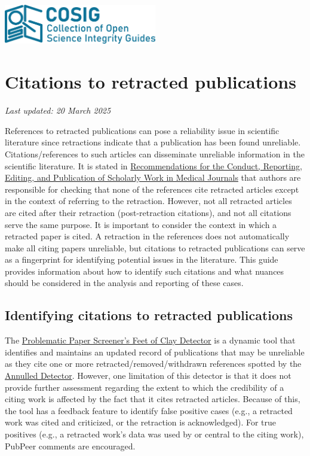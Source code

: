 \documentclass[letterpaper, 12pt]{article}
\begin{document}
\flushleft
\includegraphics[width=0.5\textwidth]{img/home/241017_final_logo_mockup.png}

\section*{Citations to retracted publications}
\textit{Last updated: 20 March 2025}

References to retracted publications can pose a reliability issue in scientific literature since retractions indicate that a publication has been found unreliable. Citations/references to such articles can disseminate unreliable information in the scientific literature. It is stated in \href{https://www.icmje.org/icmje-recommendations.pdf}{Recommendations for the Conduct, Reporting, Editing, and Publication of Scholarly Work in Medical Journals} that authors are responsible for checking that none of the references cite retracted articles except in the context of referring to the retraction. 
However, not all retracted articles are cited after their retraction (post-retraction citations), and not all citations serve the same purpose. It is important to consider the context in which a retracted paper is cited. A retraction in the references does not automatically make all citing papers unreliable, but citations to retracted publications can serve as a fingerprint for identifying potential issues in the literature. This guide provides information about how to identify such citations and what nuances should be considered in the analysis and reporting of these cases. 

\subsection*{Identifying citations to retracted publications}
The \href{https://dbrech.irit.fr/pls/apex/f?p=9999:31}{Problematic Paper Screener’s Feet of Clay Detector} is a dynamic tool that identifies and maintains an updated record of publications that may be unreliable as they cite one or more  retracted/removed/withdrawn references spotted by the \href{https://www.irit.fr/~Guillaume.Cabanac/problematic-paper-screener/annulled}{Annulled Detector}. However, one limitation of this detector is that it does not provide further assessment regarding the extent to which the credibility of a citing work is affected by the fact that it cites retracted articles. Because of this, the tool has a feedback feature to identify false positive cases (e.g., a retracted work was cited and criticized, or the retraction is acknowledged). For true positives (e.g., a retracted work’s data was used by or central to the citing work), PubPeer comments are encouraged. 
\end{document}
